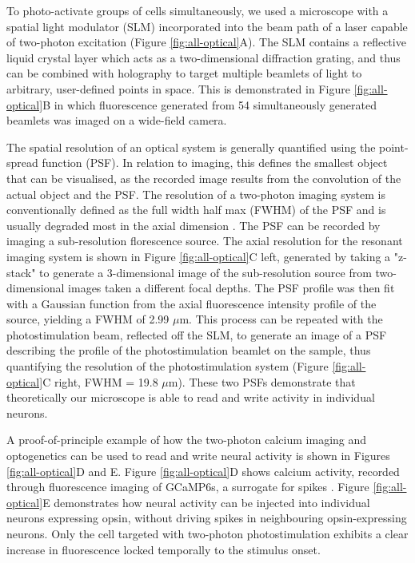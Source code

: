 To photo-activate groups of cells simultaneously, we used a microscope with
a spatial light modulator (SLM) incorporated into the beam path of a laser capable of
two-photon excitation (Figure \ref{fig:all-optical}A). The SLM contains a reflective liquid crystal layer which acts as a two-dimensional diffraction grating, and thus can be combined with  holography to target multiple beamlets of light to arbitrary, user-defined points in space. This is demonstrated in Figure \ref{fig:all-optical}B in which fluorescence generated from 54 simultaneously generated beamlets was imaged on a wide-field camera.

The spatial resolution of an optical system is generally quantified using the point-spread function (PSF). In relation to imaging, this defines the smallest object that can be visualised, as the recorded image results from the convolution of the actual object and the PSF. The resolution of a two-photon imaging system is conventionally defined as the full width half max (FWHM) of the PSF and is usually degraded most in the axial dimension \cite{shaw_point-spread_1991}. The PSF can be recorded by imaging a sub-resolution florescence source. The axial resolution for the resonant imaging system is shown in Figure \ref{fig:all-optical}C left, generated by taking a "z-stack" to generate a 3-dimensional image of the sub-resolution source from two-dimensional images taken a different focal depths. The PSF profile was then fit with a Gaussian function from the axial fluorescence intensity profile of the source, yielding a FWHM of 2.99 $\mu$m. This process can be repeated with the photostimulation beam, reflected off the SLM, to generate an image of a PSF describing the profile of the photostimulation beamlet on the sample, thus quantifying the resolution of the photostimulation system (Figure \ref{fig:all-optical}C right, FWHM = 19.8 $\mu$m). These two PSFs demonstrate that theoretically our microscope is able to read and write activity in individual neurons.

A proof-of-principle example of how the two-photon calcium imaging and optogenetics can be used to read and write neural activity is shown in Figures \ref{fig:all-optical}D and E. Figure \ref{fig:all-optical}D shows calcium activity, recorded through fluorescence imaging of GCaMP6s, a surrogate for spikes \cite{chen_ultrasensitive_2013, huang_relationship_2021, grienberger_imaging_2012, packer_simultaneous_2015, stosiek_vivo_2003}. Figure \ref{fig:all-optical}E demonstrates how neural activity can be injected into individual neurons expressing opsin, without driving spikes in neighbouring opsin-expressing neurons. Only the  cell targeted with two-photon photostimulation exhibits a clear increase in fluorescence locked  temporally to the stimulus onset.


